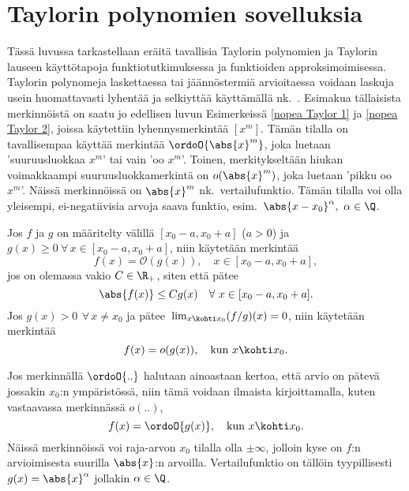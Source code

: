 \section{Taylorin polynomien sovelluksia} \label{taylorin polynomien sovelluksia}
\alku
{}

Tässä luvussa tarkastellaan eräitä tavallisia Taylorin polynomien ja Taylorin lauseen 
käyttötapoja funktiotutkimuksessa ja funktioiden approksimoimisessa. Taylorin polynomeja 
laskettaessa tai jäännöstermiä arvioitaessa voidaan laskuja usein huomattavasti lyhentää ja 
selkiyttää käyttämällä nk.\ . Esimakua tällaisista merkinnöistä 
on saatu jo edellisen luvun Esimerkeissä \ref{nopea Taylor 1} ja \ref{nopea Taylor 2}, joissa
käytettiin lyhennysmerkintää $[x^m]$. Tämän tilalla on tavallisempaa käyttää merkintää
$\ordoO{\abs{x}^m}$, joka luetaan 'suuruusluokkaa $x^m$' tai vain 'oo $x^m$'. Toinen,
merkitykseltään hiukan voimakkaampi suuruusluokkamerkintä on $o(\abs{x}^m)$, joka luetaan
'pikku oo $x^m$'. Näissä merkinnöissä on $\abs{x}^m$ nk.\ vertailufunktio. Tämän tilalla voi
olla yleisempi, ei-negatiivisia arvoja saava funktio, esim.\ 
$\abs{x-x_0}^\alpha,\ \alpha\in\Q$.
\begin{Def} \label{iso oo ja pikku oo} 
\index{suuruusluokkamerkinnät|emph} 
Jos $f$ ja $g$ on määritelty välillä $[x_0-a,x_0+a]$ ($a>0$) ja 
$g(x) \ge 0\ \forall\,x\in[x_0-a,x_0+a]$, niin käytetään merkintää
\[
f(x)=\mathcal{O}(g(x)), \quad x\in[x_0-a,x_0+a],
\]
jos on olemassa vakio $C\in\R_+$, siten että pätee
\[
\abs{f(x)}\leq Cg(x) \quad\forall\ x\in[x_0-a,x_0+a].
\]
Jos $g(x)>0\,\ \forall\,x \neq x_0$ ja pätee $\,\lim_{x\kohti x_0} (f/g)(x)=0$, niin käytetään
merkintää
\[
f(x)=o(g(x)), \quad \text {kun}\ x\kohti x_0.
\]
\end{Def}

Jos merkinnällä $\ordoO{..}$ halutaan ainoastaan kertoa, että arvio on pätevä jossakin $x_0$:n 
ympäristössä, niin tämä voidaan ilmaista kirjoittamalla, kuten vastaavassa merkinnässä $o(..)$,
\[
f(x)=\ordoO{g(x)}, \quad \text{kun}\ x\kohti x_0.
\]
Näissä merkinnöissä voi raja-arvon $x_0$ tilalla olla $\pm\infty$, jolloin kyse on $f$:n 
arvioimisesta suurilla $\abs{x}$:n arvoilla. Vertailufunktio on tällöin tyypillisesti 
$g(x)=\abs{x}^\alpha$ jollakin $\alpha\in\Q$.

